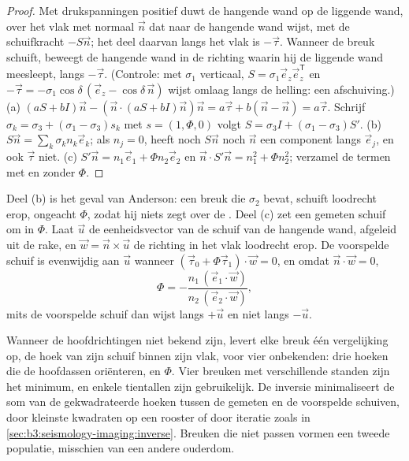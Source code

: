 \begin{proof}
Met drukspanningen positief duwt de hangende wand op de liggende wand, over het
vlak met normaal $\vec n$ dat naar de hangende wand wijst, met de
schuifkracht $-S\vec n$; het deel daarvan langs het vlak is $-\vec\tau$. Wanneer de
breuk schuift, beweegt de hangende wand in de richting waarin hij de liggende wand meesleept, langs
$-\vec\tau$. (Controle: met $\sigma_1$ verticaal, $S = \sigma_1\vec e_z\vec
e_z^{\mathsf T}$ en $-\vec\tau = -\sigma_1\cos\delta\,(\vec e_z -
\cos\delta\,\vec n)$ wijst omlaag langs de helling: een afschuiving.)
(a) $(aS + bI)\vec n - (\vec n\cdot(aS + bI)\vec n)\vec n = a\vec\tau + b(\vec
n - \vec n) = a\vec\tau$. Schrijf $\sigma_k = \sigma_3 + (\sigma_1 -
\sigma_3)s_k$ met $s = (1, \Phi, 0)$ volgt $S = \sigma_3 I + (\sigma_1 -
\sigma_3)S'$.
(b) $S\vec n = \sum_k\sigma_kn_k\vec e_k$; als $n_j = 0$, heeft noch $S\vec n$
noch $\vec n$ een component langs $\vec e_j$, en ook $\vec\tau$ niet.
(c) $S'\vec n = n_1\vec e_1 + \Phi n_2\vec e_2$ en $\vec n\cdot S'\vec n =
n_1^2 + \Phi n_2^2$; verzamel de termen met en zonder $\Phi$.
\end{proof}

Deel (b) is het geval van Anderson: een breuk die $\sigma_2$ bevat, schuift
loodrecht erop, ongeacht $\Phi$, zodat hij niets zegt over de
. Deel (c) zet een gemeten schuif om in $\Phi$. Laat $\vec u$ de eenheidsvector
van de schuif van de hangende wand, afgeleid uit de rake, en $\vec w = \vec n\times\vec
u$ de richting in het vlak loodrecht erop. De voorspelde schuif is
evenwijdig aan $\vec u$ wanneer $(\vec\tau_0 + \Phi\vec\tau_1)\cdot\vec w = 0$, en
omdat $\vec n\cdot\vec w = 0$,
\[
  \Phi = -\frac{n_1\,(\vec e_1\cdot\vec w)}{n_2\,(\vec e_2\cdot\vec w)} ,
\]
mits de voorspelde schuif dan wijst langs $+\vec u$ en niet langs $-\vec u$.

Wanneer de hoofdrichtingen niet bekend zijn, levert elke breuk één vergelijking op,
de hoek van zijn schuif binnen zijn vlak, voor vier onbekenden: drie hoeken die
de hoofdassen oriënteren, en $\Phi$. Vier breuken met verschillende standen zijn
het minimum, en enkele tientallen zijn gebruikelijk. De inversie minimaliseert de som van de
gekwadrateerde hoeken tussen de gemeten en de voorspelde schuiven, door kleinste kwadraten
op een rooster of door iteratie zoals in \cref{sec:b3:seismology-imaging:inverse}.
Breuken die niet passen vormen een tweede populatie, misschien van een andere ouderdom.

